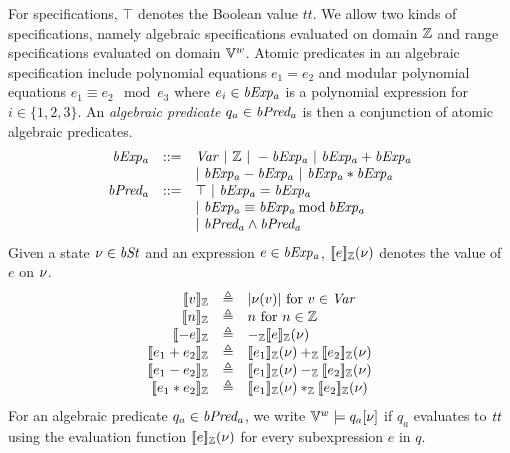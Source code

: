 For specifications, $\top$ denotes the Boolean value $\mathit{tt}$.
We allow two kinds of specifications, namely algebraic specifications evaluated on domain $\mathbb{Z}$ and range specifications evaluated on domain $\mathbb{V}^w$.
Atomic predicates in an algebraic specification include polynomial equations $e_1 = e_2$ and modular polynomial equations $e_1 \equiv e_2 \mod e_3$ where $e_i \in \mathit{bExp_a}$ is a polynomial expression for $i \in \{1, 2, 3\}$.
An \emph{algebraic predicate} $q_a \in \mathit{bPred_a}$ is then a conjunction of atomic algebraic predicates.
\[
\begin{array}{rcl}
  \mathit{bExp_a} & ::= & \mathit{Var} \ |\ \mathbb{Z} \ |\ - \mathit{bExp_a} \ |\ \mathit{bExp_a} + \mathit{bExp_a} \\
          &     & |\ \mathit{bExp_a} - \mathit{bExp_a} \ |\ \mathit{bExp_a} * \mathit{bExp_a} \\
  \mathit{bPred_a} & ::= & \top \ |\ \mathit{bExp_a} = \mathit{bExp_a} \\
           &     & |\ \mathit{bExp_a} \equiv \mathit{bExp_a} \mathbin{\textmd{mod}} \mathit{bExp_a} \\
           &     & |\ \mathit{bPred_a} \wedge \mathit{bPred_a} \\
\end{array}
\]
Given a state $\nu \in \mathit{bSt}$ and an expression $e \in \mathit{bExp_a}$, $[\![{e}]\!]_{\mathbb{Z}}(\nu)$ denotes the value of $e$ on $\nu$.
\[
\begin{array}{rcl}
  \zvalueof{v} & \defn & \unsigned{\bvst(v)} \textmd{ for $v \in \Var$} \\
  \zvalueof{n} & \defn & n \textmd{ for $n \in \bbfZ$} \\
  \zvalueof{- e} & \defn & -_\bbfZ \zvalueof{e}(\bvst) \\
  \zvalueof{e_1 + e_2} & \defn & \zvalueof{e_1}(\bvst) +_\bbfZ \zvalueof{e_2}(\bvst) \\
  \zvalueof{e_1 - e_2} & \defn & \zvalueof{e_1}(\bvst) -_\bbfZ \zvalueof{e_2}(\bvst) \\
  \zvalueof{e_1 * e_2} & \defn & \zvalueof{e_1}(\bvst) *_\bbfZ \zvalueof{e_2}(\bvst) \\
\end{array}
\]
For an algebraic predicate $q_a \in \mathit{bPred_a}$, we write $\mathbb{V}^w \models q_a[\nu]$ if $q_a$ evaluates to $\mathit{tt}$ using the evaluation function $[\![{e}]\!]_{\mathbb{Z}}(\nu)$ for every subexpression $e$ in $q$.


